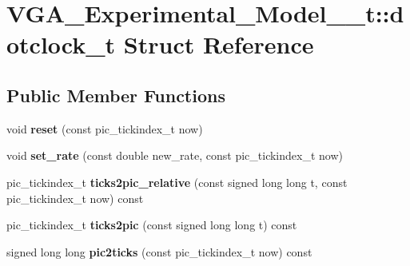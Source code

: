 \hypertarget{structVGA__Experimental__Model__1__t_1_1dotclock__t}{\section{V\-G\-A\-\_\-\-Experimental\-\_\-\-Model\-\_\-\_\-t\-:\-:dotclock\-\_\-t Struct Reference}
\label{structVGA__Experimental__Model__1__t_1_1dotclock__t}
}
\subsection*{Public Member Functions}
\begin{DoxyCompactItemize}
\item 
\hypertarget{structVGA__Experimental__Model__1__t_1_1dotclock__t_ab15a24b5b8be9da1723d2bd22e1c8161}{void {\bfseries reset} (const pic\-\_\-tickindex\-\_\-t now)}\label{structVGA__Experimental__Model__1__t_1_1dotclock__t_ab15a24b5b8be9da1723d2bd22e1c8161}

\item 
\hypertarget{structVGA__Experimental__Model__1__t_1_1dotclock__t_ad3f35a20cb0914a19674d1701121b101}{void {\bfseries set\-\_\-rate} (const double new\-\_\-rate, const pic\-\_\-tickindex\-\_\-t now)}\label{structVGA__Experimental__Model__1__t_1_1dotclock__t_ad3f35a20cb0914a19674d1701121b101}

\item 
\hypertarget{structVGA__Experimental__Model__1__t_1_1dotclock__t_aa98ab0c78c2459585f1850e93c1a6b72}{pic\-\_\-tickindex\-\_\-t {\bfseries ticks2pic\-\_\-relative} (const signed long long t, const pic\-\_\-tickindex\-\_\-t now) const }\label{structVGA__Experimental__Model__1__t_1_1dotclock__t_aa98ab0c78c2459585f1850e93c1a6b72}

\item 
\hypertarget{structVGA__Experimental__Model__1__t_1_1dotclock__t_a761effd387a5bb5949847e0d4750b189}{pic\-\_\-tickindex\-\_\-t {\bfseries ticks2pic} (const signed long long t) const }\label{structVGA__Experimental__Model__1__t_1_1dotclock__t_a761effd387a5bb5949847e0d4750b189}

\item 
\hypertarget{structVGA__Experimental__Model__1__t_1_1dotclock__t_a55cab1ab317344ea51305c271c8186a4}{signed long long {\bfseries pic2ticks} (const pic\-\_\-tickindex\-\_\-t now) const }\label{structVGA__Experimental__Model__1__t_1_1dotclock__t_a55cab1ab317344ea51305c271c8186a4}


\end{DoxyCompactItemize}
